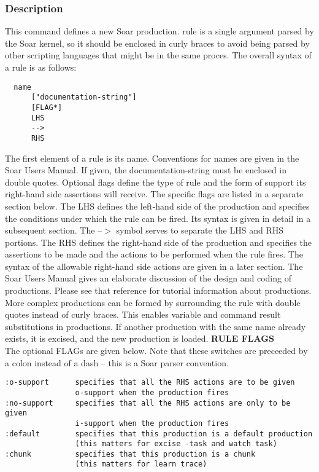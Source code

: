 \subsubsection*{Description}
 This command defines a new Soar production. rule is a single argument parsed by the Soar kernel, so it should be enclosed in curly braces to avoid being parsed by other scripting languages that might be in the same proces. The overall syntax of a rule is as follows: \begin{verbatim}
  name 
      ["documentation-string"] 
      [FLAG*]
      LHS
      -->
      RHS
\end{verbatim}
 The first element of a rule is its name. Conventions for names are given in the Soar Users Manual. If given, the documentation-string must be enclosed in double quotes. Optional flags define the type of rule and the form of support its right-hand side assertions will receive. The specific flags are listed in a separate section below. The LHS defines the left-hand side of the production and specifies the conditions under which the rule can be fired. Its syntax is given in detail in a subsequent section. The --$>$ symbol serves to separate the LHS and RHS portions. The RHS defines the right-hand side of the production and specifies the assertions to be made and the actions to be performed when the rule fires. The syntax of the allowable right-hand side actions are given in a later section. The Soar Users Manual gives an elaborate discussion of the design and coding of productions. Please see that reference for tutorial information about productions. 
  More complex productions can be formed by surrounding the rule with double quotes instead of curly braces. This enables variable and command result substitutions in productions. If another production with the same name already exists, it is excised, and the new production is loaded. 
 \textbf{RULE FLAGS}
\\ 
 The optional FLAGs are given below. Note that these switches are preceeded by a colon instead of a dash -- this is a Soar parser convention. \begin{verbatim}
:o-support      specifies that all the RHS actions are to be given
                o-support when the production fires 
:no-support     specifies that all the RHS actions are only to be given
                i-support when the production fires 
:default        specifies that this production is a default production 
                (this matters for excise -task and watch task) 
:chunk          specifies that this production is a chunk 
                (this matters for learn trace)
\end{verbatim}
